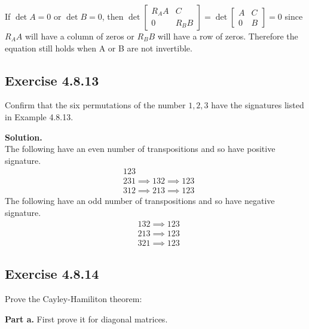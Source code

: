 \documentclass[12pt]{article}
\begin{document}
If $\det A = 0$ or $\det B = 0$, then 
$\det \begin{bmatrix}
    R_A A & C \\
    0 & R_B B
\end{bmatrix} = 
\det \begin{bmatrix}
    A & C \\
    0 & B
\end{bmatrix} = 0$ since 
$R_A A$ will have a column of zeros or
$R_B B$ will have a row of zeros.
Therefore the equation still holds 
when A or B are not invertible. 
\newpage

\subsection*{Exercise 4.8.13}
Confirm that the six permutations of the number $1,2,3$ have the signatures listed in Example 4.8.13.

\medskip

\textbf{Solution.} \\
The following have an even number of transpositions 
and so have positive signature.
\begin{align*}
    &123 \\
    &231 \implies 132 \implies 123 \\
    &312 \implies 213 \implies 123
\end{align*}
The following have an odd number of transpositions 
and so have negative signature.
\begin{align*}
    &132 \implies 123 \\
    &213 \implies 123 \\
    &321 \implies 123 
\end{align*}

\newpage





\subsection*{Exercise 4.8.14}

Prove the Cayley-Hamiliton theorem:
\medskip

\noindent\textbf{Part a.}
First prove it for diagonal matrices.
\medskip
\end{document}
